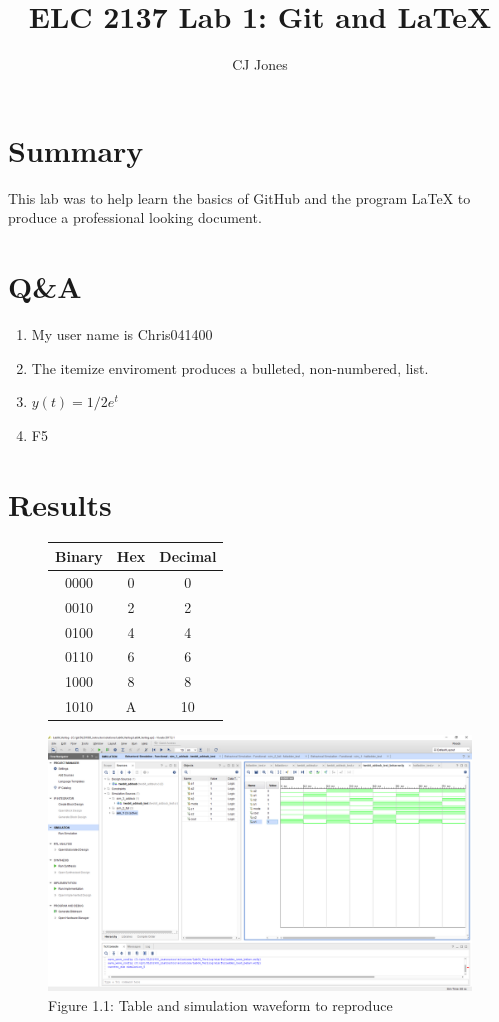 \documentclass[11pt]{article}
\begin{document}
\title{ELC 2137 Lab 1: Git and LaTeX}
\author{CJ Jones}

\maketitle


\section*{Summary}

This lab was to help learn the basics of GitHub and the program LaTeX to produce a professional looking document.


\section*{Q\&A}

\begin{enumerate}
	\item My user name is Chris041400
	\item The itemize enviroment produces a bulleted, non-numbered, list.
	\item $y(t)= 1/2e^{t}$
	\item F5
\end{enumerate}


\section*{Results}
\begin{figure}[ht]\centering

	
	\label{tbl:example_table}
	\begin{tabular}{cc|c}
		\toprule
		Binary & Hex & Decimal \\
		\midrule
		0000 & 0 & 0 \\
		0010 & 2 & 2 \\
		0100 & 4 & 4 \\
		0110 & 6 & 6 \\
		1000 & 8 & 8 \\
		1010 & A & 10\\
		\bottomrule
	\end{tabular} 
	\includegraphics[width=1.0\textwidth, trim = 19cm 15cm .5cm 4cm,clip]{lab1_example_screenshot.PNG}
    Figure 1.1: Table and simulation waveform to reproduce
\end{figure}
\end{document}
